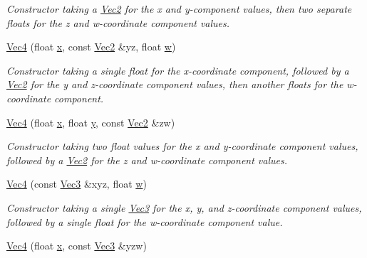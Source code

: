 \begin{DoxyCompactItemize}
\begin{DoxyCompactList}\small\item\em Constructor taking a \hyperlink{classgofxmath_1_1_vec2}{Vec2} for the x and y-\/component values, then two separate floats for the z and w-\/coordinate component values. \end{DoxyCompactList}\item 
\hyperlink{classgofxmath_1_1_vec4_a735336d8d36f719547ee48e725a3d18c}{Vec4} (float \hyperlink{classgofxmath_1_1_vec4_a5de27b4df2e699a1b30ec3a51258f208}{x}, const \hyperlink{classgofxmath_1_1_vec2}{Vec2} \&yz, float \hyperlink{classgofxmath_1_1_vec4_aeda815ed6e7a8febdffcdfa6cc8a2d04}{w})
\begin{DoxyCompactList}\small\item\em Constructor taking a single float for the x-\/coordinate component, followed by a \hyperlink{classgofxmath_1_1_vec2}{Vec2} for the y and z-\/coordinate component values, then another floats for the w-\/coordinate component. \end{DoxyCompactList}\item 
\hyperlink{classgofxmath_1_1_vec4_acb818448af5701023789e1d95070b99c}{Vec4} (float \hyperlink{classgofxmath_1_1_vec4_a5de27b4df2e699a1b30ec3a51258f208}{x}, float \hyperlink{classgofxmath_1_1_vec4_a22b749162a1507a1a5d3968b70c6ee4d}{y}, const \hyperlink{classgofxmath_1_1_vec2}{Vec2} \&zw)
\begin{DoxyCompactList}\small\item\em Constructor taking two float values for the x and y-\/coordinate component values, followed by a \hyperlink{classgofxmath_1_1_vec2}{Vec2} for the z and w-\/coordinate component values. \end{DoxyCompactList}\item 
\hyperlink{classgofxmath_1_1_vec4_a0e525327a49197ca4951d6903cdfc974}{Vec4} (const \hyperlink{classgofxmath_1_1_vec3}{Vec3} \&xyz, float \hyperlink{classgofxmath_1_1_vec4_aeda815ed6e7a8febdffcdfa6cc8a2d04}{w})
\begin{DoxyCompactList}\small\item\em Constructor taking a single \hyperlink{classgofxmath_1_1_vec3}{Vec3} for the x, y, and z-\/coordinate component values, followed by a single float for the w-\/coordinate component value. \end{DoxyCompactList}\item 
\hyperlink{classgofxmath_1_1_vec4_acab29fc5086873b1080708933ae34e4c}{Vec4} (float \hyperlink{classgofxmath_1_1_vec4_a5de27b4df2e699a1b30ec3a51258f208}{x}, const \hyperlink{classgofxmath_1_1_vec3}{Vec3} \&yzw)

\end{DoxyCompactItemize}
